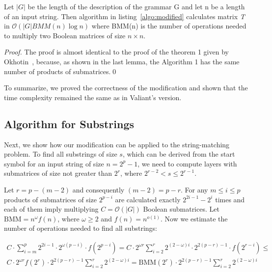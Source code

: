 \begin{theorem}
Let $|G|$ be the length of the description of the grammar G and let n be a length of an input string. Then algorithm in listing~\ref{algo:modified} calculates matrix \textit{T} in $\mathcal{O}(|G|BMM(n)\log{n})$ where BMM(n) is the number of operations needed to multiply two Boolean matrices of size $n \times n$.
\end{theorem}

\begin{proof}
The proof is almost identical to the proof of the theorem 1 given by Okhotin~\cite{Okhotin:2014:PMM:2565359.2565379}, because, as shown in the last lemma, the Algorithm 1 has the same number of products of submatrices.\qed
\end{proof}

To summarize, we proved the correctness of the modification and shown that the time complexity remained the same as in Valiant's version.


\subsection{Algorithm for Substrings}

Next, we show how our modification can be applied to the string-matching problem.
To find all substrings of size $s$, which can be derived from the start symbol for an input string of size $n = 2^p - 1$, we need to compute layers with submatrices of size not greater than $2^{r}$, where $2^{r - 2} < s \le 2^{r - 1}$.

Let $r = p - (m - 2)$ and consequently $(m - 2) = p - r$.
For any  $m \le i \le p$ products of submatrices of size $2^{p - i}$ are calculated exactly $2^{2i - 1} - 2^{i}$ times and each of them imply multiplying $C = \mathcal{O}(|G|)$ Boolean submatrices. Let $\mathrm{BMM} = n^\omega f(n)$, where $\omega \geq 2$ and $f(n) = n^{o(1)}$.
Now we estimate the number of operations needed to find all substrings:

\begin{equation*}
\begin{array}{c}
C \cdot \sum\limits_{i=m}^p 2^{2i - 1} \cdot 2^{\omega(p - i)} \cdot f(2^{p - i}) =
C \cdot 2^{\omega r}\sum\limits_{i=2}^{r} 2^{(2 - \omega)i} \cdot 2^{2(p - r) - 1} \cdot f(2^{r - i}) \le \\
C \cdot 2^{\omega r} f(2^{r}) \cdot 2^{2(p - r) - 1} \sum\limits_{i=2}^{r} 2^{(2 - \omega)i} =
\mathrm{BMM}(2^{r}) \cdot 2^{2(p - r) - 1} \sum\limits_{i=2}^{r} 2^{(2 - \omega)i}
\end{array}
\end{equation*}


